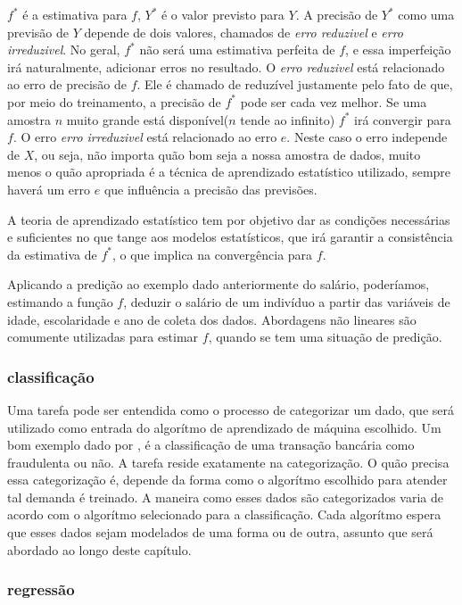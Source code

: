 $f^*$ é a estimativa para $f$, $Y^*$ é o valor previsto para $Y$. A precisão de $Y^*$ como uma previsão de $Y$ depende de dois valores, chamados de \textit{erro reduzivel} e \textit{erro irreduzivel}. No geral, $f^*$ não será uma estimativa perfeita de $f$, e essa imperfeição irá naturalmente, adicionar erros no resultado\cite{Jordan}.
O \textit{erro reduzivel} está relacionado ao erro de precisão de $f$. Ele é chamado de reduzível justamente pelo fato de que, por meio do treinamento, a precisão de $f^*$ pode ser cada vez melhor. Se uma amostra $n$ muito grande está disponível($n$ tende ao infinito) $f^*$ irá convergir para $f$\cite{Malhotra}.
O erro \textit{erro irreduzivel} está relacionado ao erro $e$. Neste caso o erro independe de $X$, ou seja, não importa quão bom seja a nossa amostra de dados, muito menos o quão apropriada é a técnica de aprendizado estatístico utilizado, sempre haverá um erro $e$ que influência a precisão das previsões\cite{Jordan}.

A teoria de aprendizado estatístico tem por objetivo dar as condições necessárias e suficientes no que tange aos modelos estatísticos, que irá
garantir a consistência da estimativa de $f^*$, o que implica na convergência para $f$\cite{Malhotra}.

Aplicando a predição ao exemplo dado anteriormente do salário, poderíamos, estimando a função $f$, deduzir
o salário de um indivíduo a partir das variáveis de idade, escolaridade e ano de coleta dos dados. Abordagens não lineares
são comumente utilizadas para estimar $f$, quando se tem uma situação de predição.

\subsubsection{classificação}

Uma tarefa pode ser entendida como o processo de categorizar um dado, que será utilizado como entrada do algorítmo de aprendizado de máquina escolhido. Um bom exemplo dado por \cite{Jordan}, é a classificação de uma
transação bancária como fraudulenta ou não. A tarefa reside exatamente na categorização. O quão precisa essa categorização é, depende da forma como o algorítmo escolhido para atender tal demanda é treinado. A maneira como esses dados são categorizados varia de acordo com o algorítmo selecionado para a classificação. Cada algorítmo espera que esses dados sejam modelados de uma forma ou de outra, assunto que será abordado ao longo deste capítulo.

\subsubsection{regressão}

